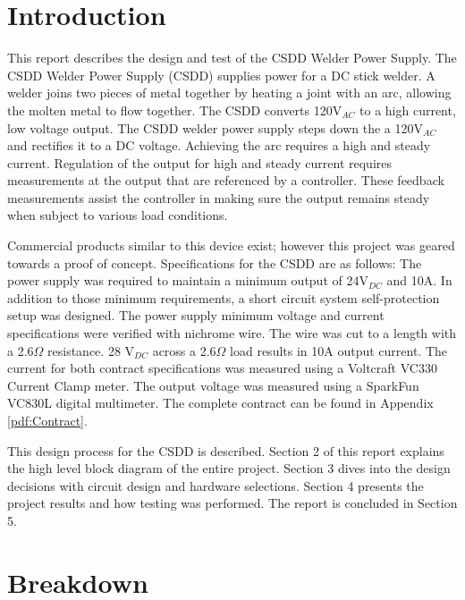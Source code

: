 \documentclass[11pt]{article}
\begin{document}
\newpage
\tableofcontents 
\newpage
\listoffigures
\newpage 
\clearpage
{} %


\section{Introduction}

This report describes the design and test of the CSDD Welder Power Supply. The CSDD Welder Power Supply (CSDD) supplies power for a DC stick welder. A welder joins two pieces of metal together by heating a joint with an arc, allowing the molten metal to flow together. The CSDD converts 120V$_{AC}$ to a high current, low voltage output. The CSDD welder power supply steps down the  a 120V$_{AC}$ and rectifies it to a DC voltage. Achieving the arc requires a high and steady current. Regulation of the output for high and steady current requires measurements at the output that are referenced by a controller. These feedback measurements assist the controller in making sure the output remains steady when subject to various load conditions. 

Commercial products similar to this device exist; however this project was geared towards a proof of concept. Specifications for the CSDD are as follows: The power supply was required to maintain a minimum output of 24V$_{DC}$ and 10A. In addition to those minimum requirements, a short circuit system self-protection setup was designed. The power supply minimum voltage and current specifications were verified with nichrome wire. The wire was cut to a length with a 2.6$\Omega$ resistance. 28 V$_{DC}$ across a 2.6$\Omega$ load results in 10A output current. The current for both contract specifications was measured using a Voltcraft VC330 Current Clamp meter. The output voltage was measured using a SparkFun VC830L digital multimeter. The complete contract can be found in Appendix \ref{pdf:Contract}.

This design process for the CSDD is described. Section 2 of this report explains the high level block diagram of the entire project. Section 3 dives into the design decisions with circuit design and hardware selections. Section 4 presents the project results and how testing was performed. The report is concluded in Section 5. 




\section{Breakdown}
\end{document}

